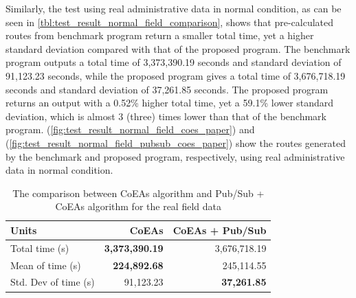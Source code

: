 \documentclass[conference]{IEEEtran}
\newcommand{\ra}[1]{\renewcommand{\arraystretch}{#1}}
\begin{document}
Similarly, the test using real administrative data in normal condition, as can be seen in \autoref{tbl:test_result_normal_field_comparison}, shows that pre-calculated routes from benchmark program return a smaller total time, yet a higher standard deviation compared with that of the proposed program. The benchmark program outputs a total time of 3,373,390.19 seconds and standard deviation of 91,123.23 seconds, while the proposed program gives a total time of 3,676,718.19 seconds and standard deviation of 37,261.85 seconds. The proposed program returns an output with a 0.52\% higher total time, yet a 59.1\% lower standard deviation, which is almost 3 (three) times lower than that of the benchmark program. (\autoref{fig:test_result_normal_field_coes_paper}) and (\autoref{fig:test_result_normal_field_pubsub_coes_paper}) show the routes generated by the benchmark and proposed program, respectively, using real administrative data in normal condition. 


\begin{table}[!]
	\centering
	\ra{1.3}
	\caption{The comparison between CoEAs algorithm and Pub/Sub + CoEAs algorithm for the real field data}
	\label{tbl:test_result_normal_field_comparison}
	\begin{tabular}{lrr}
		\toprule
		Units & CoEAs & CoEAs + Pub/Sub\\ 
		\midrule
		Total time (s) & \textbf{3,373,390.19} & 3,676,718.19\\
		Mean of time (s) & \textbf{224,892.68} & 245,114.55\\
		Std. Dev of time (s) & 91,123.23 & \textbf{37,261.85}\\
		\bottomrule
	\end{tabular}
\end{table}
\end{document}
